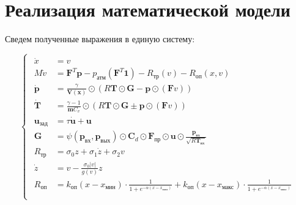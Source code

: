 
\section{Реализация математической модели}\label{sec:ch2/sec5}

Сведем полученные выражения в единую систему:

\begin{equation}\label{eq:ch2/final_system}
    \begin{cases}
        \begin{alignedat}{2}
            \dot{x}               & = v                                                                                                                                                                                                   \\
            M\dot{v}              & = \mathbf{F}^T\mathbf{p} - p_\text{атм}(\mathbf{F}^T\mathbf{1}) - R_\text{тр}(v) - R_\text{оп}(x, v)                                                                                                  \\
            \dot{\mathbf{p}}      & = \frac{\gamma}{\mathbf{V}(\mathbf{x})} \odot (R\mathbf{T} \odot \mathbf{G} - \mathbf{p} \odot (\mathbf{F}v))                                                                                         \\
            \dot{\mathbf{T}}      & = \frac{\gamma-1}{\mathbf{m}C_v} \odot (R\mathbf{T} \odot \mathbf{G} \pm \mathbf{p} \odot (\mathbf{F}v))                                                                                              \\
            \mathbf{u}_\text{зад} & = \tau \dot{\mathbf{u}} + \mathbf{u}                                                                                                                                                                  \\
            \mathbf{G}            & = \psi(\mathbf{p}_\text{вх}, \mathbf{p}_\text{вых}) \odot \mathbf{C}_d \odot \mathbf{F}_\text{пр} \odot \mathbf{u} \odot \frac{\mathbf{p}_\text{вх}}{\sqrt{R\mathbf{T}_\text{вх}}}                    \\
            R_\text{тр} &= \sigma_0 z + \sigma_1 \dot{z} + \sigma_2 v                                                                                                                              \\
            \dot{z} &= v - \frac{\sigma_0 |v|}{g(v)}z \\
            R_\text{оп}           & = k_\text{оп}(x - x_\text{мин})\cdot \frac{1}{1 + e^{-\alpha(x - x_\text{мин})}} + k_\text{оп}(x - x_\text{макс})\cdot \frac{1}{1 + e^{-\alpha(x - x_\text{макс})}}                                   \\
        \end{alignedat}
    \end{cases}
\end{equation}

